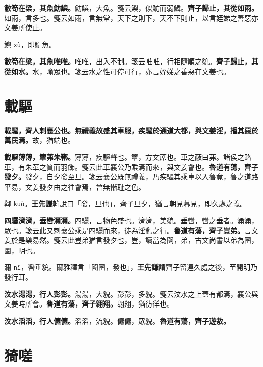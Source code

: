 \textbf{敝笱在梁，其魚魴鱮。}{\footnotesize 魴鱮，大魚。箋云鱮，似魴而弱鱗。}\textbf{齊子歸止，其從如雨。}{\footnotesize 如雨，言多也。箋云如雨，言無常，天下之則下，天不下則止，以言姪娣之善惡亦文姜所使止。}

\begin{quoting}鱮 \texttt{xù}，即鰱魚。\end{quoting}

\textbf{敝笱在梁，其魚唯唯。}{\footnotesize 唯唯，出入不制。箋云唯唯，行相隨順之貌。}\textbf{齊子歸止，其從如水。}{\footnotesize 水，喻眾也。箋云水之性可停可行，亦言姪娣之善惡在文姜也。}

\section{載驅}


\textbf{載驅，齊人刺襄公也。無禮義故盛其車服，疾驅於通道大都，與文姜淫，播其惡於萬民焉。}{\footnotesize 故，猶端也。}

\textbf{載驅薄薄，簟茀朱鞹。}{\footnotesize 薄薄，疾驅聲也。簟，方文蓆也。車之蔽曰茀。諸侯之路車，有朱革之質而羽飾。箋云此車襄公乃乘焉而來，與文姜會也。}\textbf{魯道有蕩，齊子發夕。}{\footnotesize 發夕，自夕發至旦。箋云襄公既無禮義，乃疾驅其乘車以入魯竟，魯之道路平易，文姜發夕由之往會焉，曾無慚耻之色。}

\begin{quoting}鞹 \texttt{kuò}。\textbf{王先謙}韓說曰「發，旦也」，齊子旦夕，猶言朝見暮見，即久處之義。\end{quoting}

\textbf{四驪濟濟，垂轡濔濔。}{\footnotesize 四驪，言物色盛也。濟濟，美貌。垂轡，轡之垂者。濔濔，眾也。箋云此又刺襄公乘是四驪而來，徒為淫亂之行。}\textbf{魯道有蕩，齊子豈弟。}{\footnotesize 言文姜於是樂易然。箋云此豈弟猶言發夕也，豈，讀當為闓，弟，古文尚書以弟為圛，圛，明也。}

\begin{quoting}濔 \texttt{nǐ}，轡垂貌。爾雅釋言「闓圛，發也」，\textbf{王先謙}謂齊子留連久處之後，至開明乃發行耳。\end{quoting}

\textbf{汶水湯湯，行人彭彭。}{\footnotesize 湯湯，大貌。彭彭，多貌。箋云汶水之上蓋有都焉，襄公與文姜時所會。}\textbf{魯道有蕩，齊子翱翔。}{\footnotesize 翱翔，猶彷徉也。}

\textbf{汶水滔滔，行人儦儦。}{\footnotesize 滔滔，流貌。儦儦，眾貌。}\textbf{魯道有蕩，齊子遊敖。}

\section{猗嗟}

